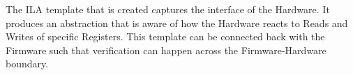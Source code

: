\documentclass[../report.tex]{subfiles}
\begin{document}
The ILA template that is created captures the interface of the Hardware.
It produces an abstraction that is aware of how the Hardware reacts to Reads and
Writes of specific Registers.
This template can be connected back with the Firmware such that verification can
happen across the Firmware-Hardware boundary.
\end{document}
